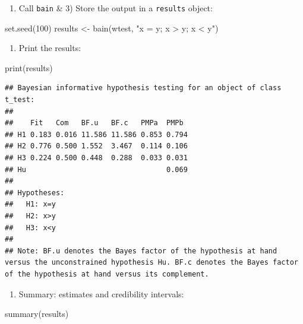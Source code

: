 \documentclass[
]{book}
\newenvironment{Shaded}{\begin{snugshade}}{\end{snugshade}}
\newcommand{\DecValTok}[1]{\textcolor[rgb]{0.00,0.00,0.81}{#1}}
\newcommand{\FunctionTok}[1]{\textcolor[rgb]{0.00,0.00,0.00}{#1}}
\newcommand{\NormalTok}[1]{#1}
\newcommand{\OtherTok}[1]{\textcolor[rgb]{0.56,0.35,0.01}{#1}}
\newcommand{\StringTok}[1]{\textcolor[rgb]{0.31,0.60,0.02}{#1}}
\providecommand{\tightlist}{%
  \setlength{\itemsep}{0pt}\setlength{\parskip}{0pt}}
\begin{document}
\begin{enumerate}
\def\labelenumi{\arabic{enumi})}
\setcounter{enumi}{1}
\tightlist
\item
  Call \texttt{bain} \& 3) Store the output in a \texttt{results} object:
\end{enumerate}

\begin{Shaded}
\begin{Highlighting}[]
\FunctionTok{set.seed}\NormalTok{(}\DecValTok{100}\NormalTok{)}
\NormalTok{results }\OtherTok{\textless{}{-}} \FunctionTok{bain}\NormalTok{(wtest, }\StringTok{"x = y; x \textgreater{} y; x \textless{} y"}\NormalTok{)}
\end{Highlighting}
\end{Shaded}

\begin{enumerate}
\def\labelenumi{\arabic{enumi})}
\setcounter{enumi}{2}
\tightlist
\item
  Print the results:
\end{enumerate}

\begin{Shaded}
\begin{Highlighting}[]
\FunctionTok{print}\NormalTok{(results)}
\end{Highlighting}
\end{Shaded}

\begin{verbatim}
## Bayesian informative hypothesis testing for an object of class t_test:
## 
##    Fit   Com   BF.u   BF.c   PMPa  PMPb 
## H1 0.183 0.016 11.586 11.586 0.853 0.794
## H2 0.776 0.500 1.552  3.467  0.114 0.106
## H3 0.224 0.500 0.448  0.288  0.033 0.031
## Hu                                 0.069
## 
## Hypotheses:
##   H1: x=y
##   H2: x>y
##   H3: x<y
## 
## Note: BF.u denotes the Bayes factor of the hypothesis at hand versus the unconstrained hypothesis Hu. BF.c denotes the Bayes factor of the hypothesis at hand versus its complement.
\end{verbatim}

\begin{enumerate}
\def\labelenumi{\arabic{enumi})}
\setcounter{enumi}{3}
\tightlist
\item
  Summary: estimates and credibility intervals:
\end{enumerate}

\begin{Shaded}
\begin{Highlighting}[]
\FunctionTok{summary}\NormalTok{(results)}
\end{Highlighting}
\end{Shaded}
\end{document}
